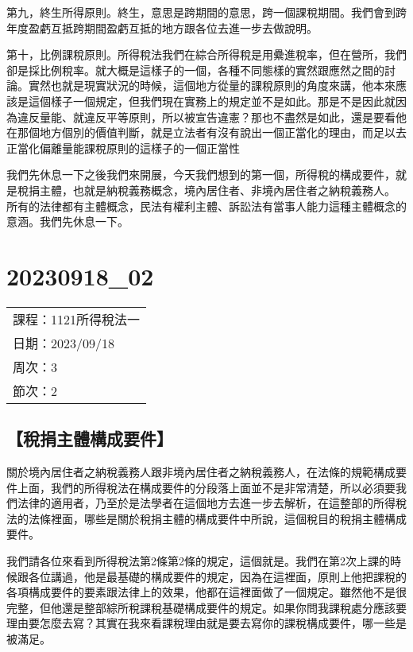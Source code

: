 \documentclass[]{ctexbook}
\begin{document}
第九，終生所得原則。終生，意思是跨期間的意思，跨一個課稅期間。我們會到跨年度盈虧互抵跨期間盈虧互抵的地方跟各位去進一步去做說明。

第十，比例課稅原則。所得稅法我們在綜合所得稅是用纍進稅率，但在營所，我們卻是採比例稅率。就大概是這樣子的一個，各種不同態樣的實然跟應然之間的討論。實然也就是現實狀況的時候，這個地方從量的課稅原則的角度來講，他本來應該是這個樣子一個規定，但我們現在實務上的規定並不是如此。那是不是因此就因為違反量能、就違反平等原則，所以被宣告違憲？那也不盡然是如此，還是要看他在那個地方個別的價值判斷，就是立法者有沒有說出一個正當化的理由，而足以去正當化偏離量能課稅原則的這樣子的一個正當性

我們先休息一下之後我們來開展，今天我們想到的第一個，所得稅的構成要件，就是稅捐主體，也就是納稅義務概念，境內居住者、非境內居住者之納稅義務人。
所有的法律都有主體概念，民法有權利主體、訴訟法有當事人能力這種主體概念的意涵。我們先休息一下。

\hypertarget{section-6}{%
\chapter{20230918\_02}\label{section-6}}

\begin{longtable}[]{@{}l@{}}
\toprule()
\endhead
課程：1121所得稅法一 \\
日期：2023/09/18 \\
周次：3 \\
節次：2 \\
\bottomrule()
\end{longtable}

\hypertarget{ux7a05ux6350ux4e3bux9ad4ux69cbux6210ux8981ux4ef6}{%
\section{【稅捐主體構成要件】}\label{ux7a05ux6350ux4e3bux9ad4ux69cbux6210ux8981ux4ef6}}

關於境內居住者之納稅義務人跟非境內居住者之納稅義務人，在法條的規範構成要件上面，我們的所得稅法在構成要件的分段落上面並不是非常清楚，所以必須要我們法律的適用者，乃至於是法學者在這個地方去進一步去解析，在這整部的所得稅法的法條裡面，哪些是關於稅捐主體的構成要件中所說，這個稅目的稅捐主體構成要件。

我們請各位來看到所得稅法第2條第2條的規定，這個就是。我們在第2次上課的時候跟各位講過，他是最基礎的構成要件的規定，因為在這裡面，原則上他把課稅的各項構成要件的要素跟法律上的效果，他都在這裡面做了一個規定。雖然他不是很完整，但他還是整部綜所稅課稅基礎構成要件的規定。如果你問我課稅處分應該要理由要怎麼去寫？其實在我來看課稅理由就是要去寫你的課稅構成要件，哪一些是被滿足。
\end{document}
